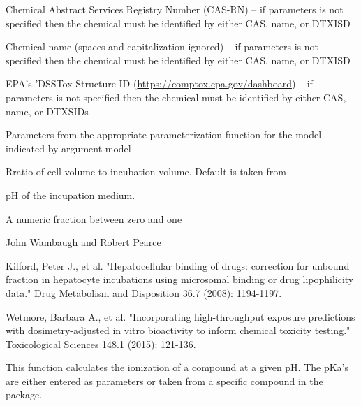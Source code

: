 \documentclass[a4paper]{book}
\begin{document}
\begin{Arguments}
\begin{ldescription}
\item[\code{chem.cas}] Chemical Abstract Services Registry Number (CAS-RN) -- if
parameters is not specified then the chemical must be identified by either
CAS, name, or DTXISD

\item[\code{chem.name}] Chemical name (spaces and capitalization ignored) --  if
parameters is not specified then the chemical must be identified by either
CAS, name, or DTXISD

\item[\code{dtxsid}] EPA's 'DSSTox Structure ID (\url{https://comptox.epa.gov/dashboard})
-- if parameters is not specified then the chemical must be identified by 
either CAS, name, or DTXSIDs

\item[\code{parameters}] Parameters from the appropriate parameterization function
for the model indicated by argument model

\item[\code{Vr}] Rratio of cell volume to incubation volume. Default is taken from

\item[\code{pH}] pH of the incupation medium.
\end{ldescription}
\end{Arguments}
%
\begin{Value}
A numeric fraction between zero and one
\end{Value}
%
\begin{Author}\relax
John Wambaugh and Robert Pearce
\end{Author}
%
\begin{References}\relax
Kilford, Peter J., et al. "Hepatocellular binding of drugs: 
correction for unbound fraction in hepatocyte incubations using microsomal 
binding or drug lipophilicity data." Drug Metabolism and Disposition 36.7 
(2008): 1194-1197.

Wetmore, Barbara A., et al. "Incorporating high-throughput exposure 
predictions with dosimetry-adjusted in vitro bioactivity to inform chemical 
toxicity testing." Toxicological Sciences 148.1 (2015): 121-136.
\end{References}
%
\begin{Description}\relax
This function calculates the ionization of a compound at a given pH. The 
pKa's are either entered as parameters or taken from a specific compound in
the package.
\end{Description}
\end{document}
